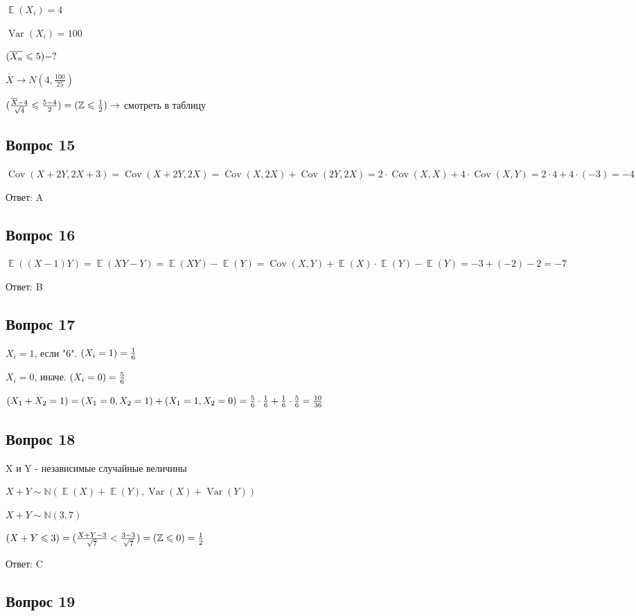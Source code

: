 \documentclass[a4paper]{article} %
\DeclareMathOperator{\Var}{Var}
\DeclareMathOperator{\Cov}{Cov}
\DeclareMathOperator{\E}{\mathbb{E}}
\let\P\relax
\DeclareMathOperator{\P}{\mathbb{P}}
\newcommand \N{\mathbb{N}}
\newcommand \Z{\mathbb{Z}}
\renewcommand{\leq}{\leqslant}
\begin{document}
\begin{flushleft}
$\E(X_i) = 4$

$\Var(X_i) = 100$

$\P(\overline{X_n} \leq 5) - ?$

$\overline{X} \rightarrow N(4,\frac{100}{25})$

$\P(\frac{\overline{X} - 4}{\sqrt{4}} \leq \frac{5-4}{2}) = \P(\Z\leq \frac{1}{2}) \rightarrow$ смотреть в таблицу

\subsection{Вопрос 15}

$\Cov(X+2Y, 2X + 3) = \Cov(X+2Y, 2X) = \Cov(X, 2X) + \Cov(2Y, 2X) = 2 \cdot \Cov(X,X) + 4 \cdot \Cov(X,Y) = 2 \cdot 4 + 4 \cdot (-3) = -4$

Ответ: A

\subsection{Вопрос 16}

$\E((X-1)Y) = \E(XY - Y) = \E(XY) - \E(Y) = \Cov(X,Y) + \E(X)\cdot \E(Y) - \E(Y) = -3 + (-2) - 2 = -7$

Ответ: B

\subsection{Вопрос 17}

$X_{i} = 1$, если "6". $\P(X_{i} = 1) = \frac{1}{6}$

$X_{i} = 0$, иначе. $\P(X_{i} = 0) = \frac{5}{6}$

$\P(X_{1} + X_{2} = 1) = \P(X_{1} = 0, X_{2} = 1) + \P(X_{1} = 1, X_{2} = 0) = \frac{5}{6} \cdot \frac{1}{6} + \frac{1}{6} \cdot \frac{5}{6} = \frac{10}{36}$

\subsection{Вопрос 18}

X и Y - независимые случайные величины

$X + Y \sim \N(\E(X) + \E(Y), \Var(X) + \Var(Y))$

$X + Y \sim \N(3,7)$

$\P(X + Y\leq 3) = \P(\frac{X+Y-3}{\sqrt{7}} < \frac{3-3}{\sqrt{7}}) = (\Z\leq 0) = \frac{1}{2}$

Ответ: C

\subsection{Вопрос 19}


\end{flushleft}
\end{document}
